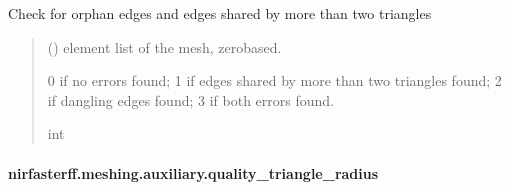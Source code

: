 \documentclass[letterpaper,10pt,english]{sphinxmanual}
\begin{document}
\begin{fulllineitems}
\label{\detokenize{_autosummary/nirfasterff.meshing.auxiliary.checkedges:nirfasterff.meshing.auxiliary.checkedges}}
\pysigstartsignatures
{}
\pysigstopsignatures
\sphinxAtStartPar
Check for orphan edges and edges shared by more than two triangles
\begin{quote}\begin{description}
\sphinxAtStartPar
{} () \textendash{} element list of the mesh, zero\sphinxhyphen{}based.

\sphinxAtStartPar
{} \textendash{} 0 if no errors found; 1 if edges shared by more than two triangles found; 2 if dangling edges found; 3 if both errors found.

\sphinxAtStartPar
int

\end{description}\end{quote}

\end{fulllineitems}


\sphinxstepscope


\paragraph{nirfasterff.meshing.auxiliary.quality\_triangle\_radius}
\label{\detokenize{_autosummary/nirfasterff.meshing.auxiliary.quality_triangle_radius:nirfasterff-meshing-auxiliary-quality-triangle-radius}}\label{\detokenize{_autosummary/nirfasterff.meshing.auxiliary.quality_triangle_radius::doc}}
\end{document}
